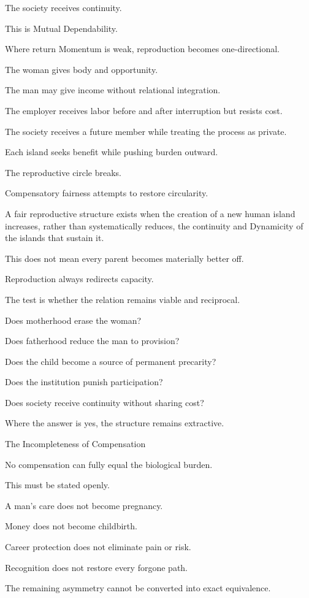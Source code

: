 The society receives continuity.

This is Mutual Dependability.

Where return Momentum is weak, reproduction becomes one-directional.

The woman gives body and opportunity.

The man may give income without relational integration.

The employer receives labor before and after interruption but resists cost.

The society receives a future member while treating the process as private.

Each island seeks benefit while pushing burden outward.

The reproductive circle breaks.

Compensatory fairness attempts to restore circularity.

A fair reproductive structure exists when the creation of a new human island increases, rather than systematically reduces, the continuity and Dynamicity of the islands that sustain it.

This does not mean every parent becomes materially better off.

Reproduction always redirects capacity.

The test is whether the relation remains viable and reciprocal.

Does motherhood erase the woman?

Does fatherhood reduce the man to provision?

Does the child become a source of permanent precarity?

Does the institution punish participation?

Does society receive continuity without sharing cost?

Where the answer is yes, the structure remains extractive.

The Incompleteness of Compensation

No compensation can fully equal the biological burden.

This must be stated openly.

A man’s care does not become pregnancy.

Money does not become childbirth.

Career protection does not eliminate pain or risk.

Recognition does not restore every forgone path.

The remaining asymmetry cannot be converted into exact equivalence.

